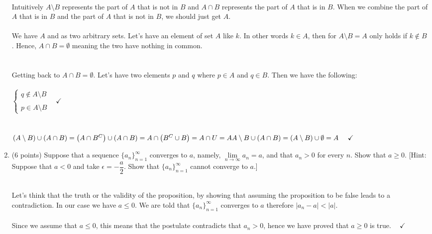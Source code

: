 \documentclass[fleqn]{article}
\begin{document}
\begin{enumerate}
      \textcolor{hwColor}{
        \\
        Intuitively $A \setminus B$ represents the part of $A$ that is not in $B$ and $A \cap B$ represents the part of $A$ that is in $B$.
        When we combine the part of $A$ that is in $B$ and the part of $A$ that is not in $B$, we should just get $A$.
        \\
        \\
        We have $A$ and as two arbitrary sets. Let's have an element of set $A$ like $k$. In other words $k \in A$, then 
        for $A \setminus B=A$ only holds if $k \notin B$. Hence, $A \cap B=\emptyset$ meaning the two have nothing in common.
        \\
        \\
        \\
        Getting back to $A \cap B=\emptyset$. Let's have two elements $p$ and $q$ where $p \in A$ and $q \in B$. Then we have the following:
        \\
        \\
        $
          \begin{cases}
            q \notin A \setminus B
            \\
            \\
            p \in A \setminus B
          \end{cases} ~~~~ \checkmark
        $
        \\
        \\
        \\
        $
          \left(A \setminus B\right) \cup \left(A \cap B\right)
          =\left(A \cap B^C\right) \cup \left(A \cap B\right)
          =A \cap \left(B^C \cup B\right)
          =A \cap U
          =A
          \\
          \\
          \\
          A \setminus B \cup \left(A \cap B\right)=\left(A \setminus B\right) \cup \emptyset=A ~~~~ \checkmark
        $
      }


    \item (6 points) Suppose that a sequence $\{a_n\}_{n=1}^{\infty}$ converges to $a$, namely,
    $\lim\limits_{n\to\infty} a_n=a$, and that $a_n>0$ for every $n$. Show that $a \geq 0$. 
    [Hint: Suppose that $a<0$ and take $\epsilon=-\dfrac{a}{2}$. Show that $\{a_n\}_{n=1}^{\infty}$ cannot converge to $a$.]

      \textcolor{hwColor}{
        \\
        Let's think that the truth or the validity of the proposition, by showing that assuming the proposition 
        to be false leads to a contradiction. In our case we have $a \leq 0$. We are told that 
        $\{a_n\}_{n=1}^{\infty}$ converges to $a$ therefore $|a_n-a| < |a|$. 
        \\
        \\
        Since we assume that $a \leq 0$, this means that the postulate contradicts that $a_n >0$, hence we have proved that
        $a \geq 0$ is true. $~~~~ \checkmark$
      }



\end{enumerate}
\end{document}
